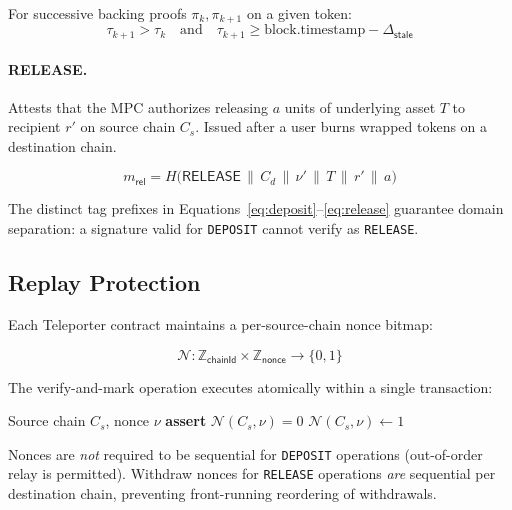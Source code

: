 \begin{invariant}
For successive backing proofs $\pi_k, \pi_{k+1}$ on a given token:
\begin{equation}
  \tau_{k+1} > \tau_k \quad \text{and} \quad \tau_{k+1} \geq \mathrm{block.timestamp} - \Delta_{\mathsf{stale}}
\end{equation}
\end{invariant}

\paragraph{RELEASE.} Attests that the MPC authorizes releasing $a$ units of underlying asset $T$ to recipient $r'$ on source chain $C_s$. Issued after a user burns wrapped tokens on a destination chain.

\begin{equation}
  m_{\mathsf{rel}} = H\bigl(\mathsf{RELEASE} \,\|\, C_d \,\|\, \nu' \,\|\, T \,\|\, r' \,\|\, a\bigr)
  \label{eq:release}
\end{equation}

The distinct tag prefixes in Equations~\eqref{eq:deposit}--\eqref{eq:release} guarantee domain separation: a signature valid for \texttt{DEPOSIT} cannot verify as \texttt{RELEASE}.

\subsection{Replay Protection}
\label{sec:replay}

Each Teleporter contract maintains a per-source-chain nonce bitmap:

\begin{equation}
  \mathcal{N}: \mathbb{Z}_{\mathsf{chainId}} \times \mathbb{Z}_{\mathsf{nonce}} \to \{0, 1\}
\end{equation}

The verify-and-mark operation executes atomically within a single transaction:

\begin{algorithm}[H]
\caption{Atomic Nonce Check-and-Set}
\begin{algorithmic}[1]
\Require Source chain $C_s$, nonce $\nu$
\State \textbf{assert} $\mathcal{N}(C_s, \nu) = 0$ 
\State $\mathcal{N}(C_s, \nu) \leftarrow 1$
\end{algorithmic}
\end{algorithm}

Nonces are \emph{not} required to be sequential for \texttt{DEPOSIT} operations (out-of-order relay is permitted). Withdraw nonces for \texttt{RELEASE} operations \emph{are} sequential per destination chain, preventing front-running reordering of withdrawals.

